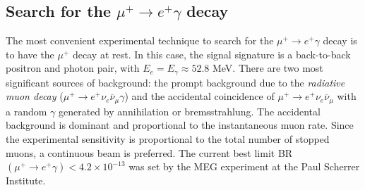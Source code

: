 \documentclass[12pt,a4paper,openright, oneside, titlepage]{book} %
\begin{document}

\subsection{Search for the $\mu^+ \rightarrow e^+ \gamma$ decay}
The most convenient experimental technique to search for the $\mu^+ \rightarrow e^+ \gamma$ decay is to have the $\mu^+$ decay at rest. 
In this case, the signal signature is a back-to-back positron and photon pair, with $E_e=E_\gamma\approx 52.8$ MeV. 
There are two most significant sources of background: the prompt background due to the \textit{radiative muon decay} ($\mu^+\rightarrow e^+ \nu_e \overline{\nu}_\mu\gamma$) and the accidental coincidence of $\mu^+\rightarrow e^+ \nu_e \overline{\nu}_\mu$ with a random $\gamma$ generated by annihilation or bremsstrahlung.
The accidental background is dominant and proportional to the instantaneous muon rate. 
Since the experimental sensitivity is proportional to the total number of stopped muons, a continuous beam is preferred.
The current best limit  BR$(\mu^+\rightarrow e^+\gamma)<4.2\times10^{-13}$ was set by the MEG experiment at the Paul Scherrer Institute\cite{MEG}.
\end{document}
